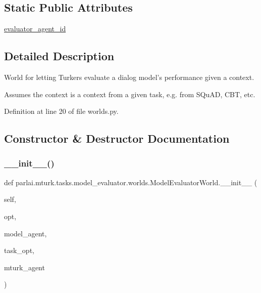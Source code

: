 \subsection*{Static Public Attributes}
\begin{DoxyCompactItemize}
\item 
\hyperlink{classparlai_1_1mturk_1_1tasks_1_1model__evaluator_1_1worlds_1_1ModelEvaluatorWorld_a519a1cdda4c2838d30610bce070cfe11}{evaluator\+\_\+agent\+\_\+id}
\end{DoxyCompactItemize}


\subsection{Detailed Description}
\begin{DoxyVerb}World for letting Turkers evaluate a dialog model's performance given a context.

Assumes the context is a context from a given task, e.g. from SQuAD, CBT, etc.
\end{DoxyVerb}
 

Definition at line 20 of file worlds.\+py.



\subsection{Constructor \& Destructor Documentation}
\mbox{\label{classparlai_1_1mturk_1_1tasks_1_1model__evaluator_1_1worlds_1_1ModelEvaluatorWorld_aeb81d4953ba69b9b837d7af56cfd4fed}} 
\subsubsection{\texorpdfstring{\+\_\+\+\_\+init\+\_\+\+\_\+()}{\_\_init\_\_()}}
{\footnotesize\ttfamily def parlai.\+mturk.\+tasks.\+model\+\_\+evaluator.\+worlds.\+Model\+Evaluator\+World.\+\_\+\+\_\+init\+\_\+\+\_\+ (\begin{DoxyParamCaption}\item[{}]{self,  }\item[{}]{opt,  }\item[{}]{model\+\_\+agent,  }\item[{}]{task\+\_\+opt,  }\item[{}]{mturk\+\_\+agent }\end{DoxyParamCaption})}



